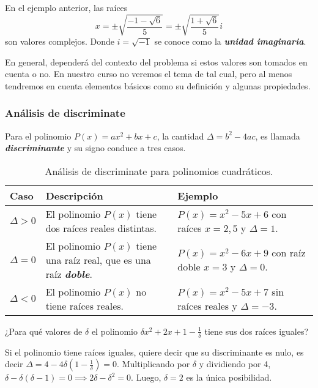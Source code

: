 En el ejemplo anterior, las raíces
\[
    x = \pm \sqrt {\frac{-1 - \sqrt{6}}{5}} = \pm \sqrt {\frac{1 + \sqrt{6}}{5}} i
\]
son valores complejos.
Donde $i = \sqrt {-1}$ se conoce como la \textbf{\emph{unidad imaginaria}}.

En general, dependerá del contexto del problema si estos valores son tomados en cuenta o no.
En nuestro curso no veremos el tema de  tal cual, pero al menos tendremos en cuenta elementos básicos como su definición y algunas propiedades.



\subsubsection{Análisis de discriminate}

Para el polinomio $P(x) = ax^2 + bx + c$, la cantidad $\Delta = b^2 - 4ac$, es llamada \textbf{\emph{discriminante}} y su signo conduce a tres casos.
\begin{table}[H]
    \centering
    \begin{tabular}{| p{1.4cm} | p{6.5cm} | p{6.5cm} |}
        \hline
        Caso & Descripción & Ejemplo \\ \hline
        $\Delta > 0$ & El polinomio $P(x)$ tiene dos raíces reales distintas.&
            $P(x) = x^2 - 5x + 6$ con raíces $x = 2, 5$ y $\Delta = 1$. \\\hline
        $\Delta = 0$ & El polinomio $P(x)$ tiene una raíz real, que es una raíz \textbf{\emph{doble}}.&
            $P(x) = x^2 - 6x + 9$ con raíz doble $x = 3$ y $\Delta = 0$. \\\hline
        $\Delta < 0$ & El polinomio $P(x)$ no tiene raíces reales.&
            $P(x) = x^2 - 5x + 7$ sin raíces reales y $\Delta = -3$. \\\hline
    \end{tabular}
    \caption{Análisis de discriminate para polinomios cuadráticos.}
\end{table}

\begin{example}
    ¿Para qué valores de $\delta$ el polinomio $\delta x^2 + 2x + 1 - \frac{1}{\delta}$ tiene sus dos raíces iguales?
\end{example}
\begin{solution}
    Si el polinomio tiene raíces iguales, quiere decir que su discriminante es nulo, es decir $\Delta = 4 - 4\delta \left(1 - \frac{1}{\delta}\right) = 0$.
    Multiplicando por $\delta$ y dividiendo por 4, $ \delta - \delta (\delta - 1) = 0 \implies 2\delta - \delta^2 = 0$.
    Luego, $\delta = 2$ es la única posibilidad.
\end{solution}


